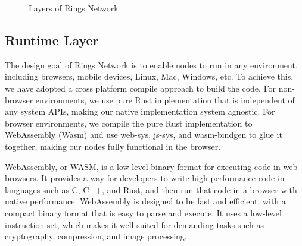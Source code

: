 \documentclass[twocolumn]{article}
\begin{document}
\begin{figure}[htbp]
\centering
{}
\caption{Layers of Rings Network}
\end{figure}





\subsection{Runtime Layer}

The design goal of Rings Network is to enable nodes to run in any environment, including browsers, mobile devices, Linux, Mac, Windows, etc. To achieve this, we have adopted a cross platform compile approach to build the code. For non-browser environments, we use pure Rust implementation that is independent of any system APIs, making our native implementation system agnostic. For browser environments, we compile the pure Rust implementation to WebAssembly (Wasm) and use web-sys, js-sys, and wasm-bindgen to glue it together, making our nodes fully functional in the browser.


WebAssembly, or WASM, is a low-level binary format for executing code in web browsers. It provides a way for developers to write high-performance code in languages such as C, C++, and Rust, and then run that code in a browser with native performance. WebAssembly is designed to be fast and efficient, with a compact binary format that is easy to parse and execute. It uses a low-level instruction set, which makes it well-suited for demanding tasks such as cryptography, compression, and image processing.
\end{document}

